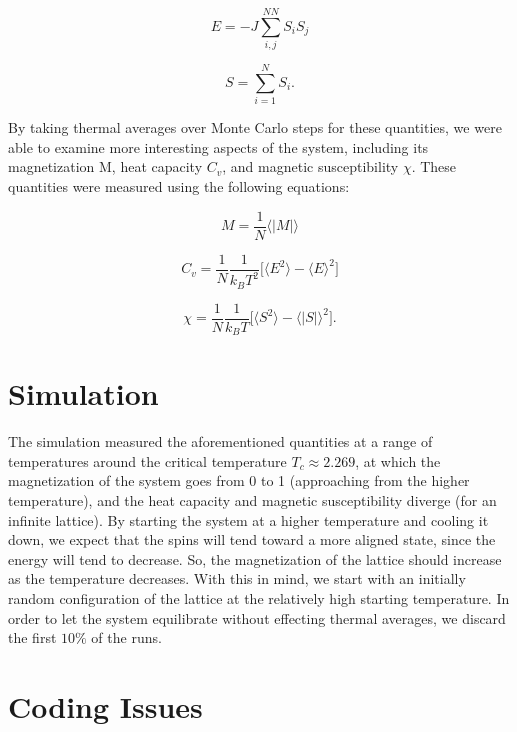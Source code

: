 \documentclass[12pt]{article}
\begin{document}
\begin{equation}
E = -J \sum_{i,j}^{NN} S_i S_j 
\end{equation}

\begin{equation}
S =  \sum_{i=1}^{N} S_i.
\end{equation}


By taking thermal averages over Monte Carlo steps for these quantities, we were able to examine more interesting aspects of 
the system, including its magnetization M, heat capacity $C_v$, and magnetic susceptibility $\chi$. These quantities were 
measured using the following equations:


\begin{equation}
M = \frac{1}{N} \langle |M| \rangle
\end{equation}

\begin{equation}
C_v = \frac{1}{N} \frac{1}{k_B T^2} \Big[ \langle E^2 \rangle - \langle E \rangle ^2 \Big]
\end{equation}

\begin{equation}
\chi = \frac{1}{N} \frac{1}{k_B T} \Big[ \langle S^2 \rangle - \langle |S| \rangle ^2 \Big].
\end{equation}


\section{Simulation}

The simulation measured the aforementioned quantities at a range of temperatures around the critical temperature $T_c \approx 2.269$, 
at which the magnetization of the system goes from 0 to 1 (approaching from the higher temperature), and the heat capacity 
and magnetic susceptibility diverge (for an infinite lattice). By starting the system at a higher temperature and cooling 
it down, we expect that the spins will tend toward a more aligned state, since the energy will tend to decrease. So, the 
magnetization of the lattice should increase as the temperature decreases. With this in mind, we start with an initially random 
configuration of the lattice at the relatively high starting temperature. In order to let the system equilibrate 
without effecting thermal averages, we discard the first $10 \%$ of the runs. 


\section{Coding Issues}
\end{document}
